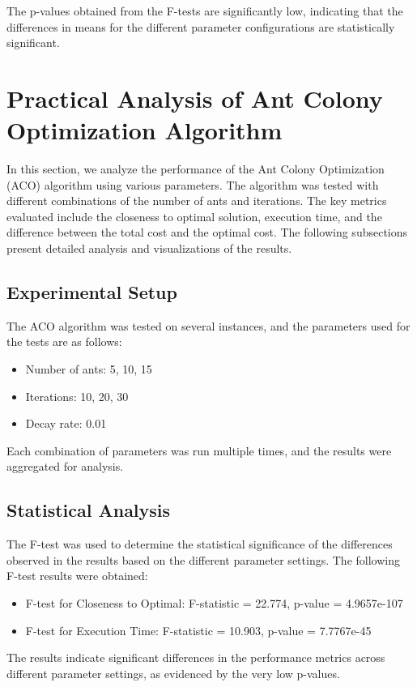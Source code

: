 \documentclass[
]{article}
\begin{document}
    The p-values obtained from the F-tests are significantly low, indicating that the differences in means for the different parameter configurations are statistically significant.


    \section{Practical Analysis of Ant Colony Optimization Algorithm}\label{sec:practical-analysis-of-ant-colony-optimization-algorithm}

    In this section, we analyze the performance of the Ant Colony Optimization (ACO) algorithm using various parameters. The algorithm was tested with different combinations of the number of ants and iterations. The key metrics evaluated include the closeness to optimal solution, execution time, and the difference between the total cost and the optimal cost. The following subsections present detailed analysis and visualizations of the results.

    \subsection{Experimental Setup}\label{subsec:experimental-setup}
    The ACO algorithm was tested on several instances, and the parameters used for the tests are as follows:
    \begin{itemize}
        \item Number of ants: 5, 10, 15
        \item Iterations: 10, 20, 30
        \item Decay rate: 0.01
    \end{itemize}
    Each combination of parameters was run multiple times, and the results were aggregated for analysis.

    \subsection{Statistical Analysis}\label{subsec:statistical-analysis}
    The F-test was used to determine the statistical significance of the differences observed in the results based on the different parameter settings. The following F-test results were obtained:
    \begin{itemize}
        \item F-test for Closeness to Optimal: F-statistic = 22.774, p-value = 4.9657e-107
        \item F-test for Execution Time: F-statistic = 10.903, p-value = 7.7767e-45
    \end{itemize}
    The results indicate significant differences in the performance metrics across different parameter settings, as evidenced by the very low p-values.
\end{document}
